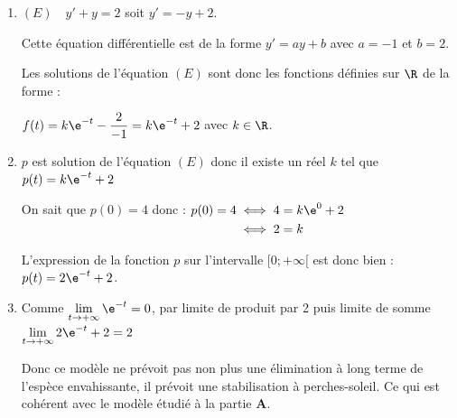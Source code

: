 	\begin{enumerate}
		\item $(E) \quad y'+y=2$ \quad soit \quad $y'=-y+2$.

		Cette équation différentielle est de la forme \quad $y'=ay+b$ \quad avec $a=-1$ et $b=2$.

		Les solutions de l'équation $(E)$ sont donc les fonctions définies sur $\R$ de la forme :

		$f(t) = k \e^{-t} - \dfrac{2}{-1}= k\e^{-t} +2$ \quad avec $k \in \R$.


		\item $p$ est solution de l'équation $(E)$ donc il existe un réel $k$ tel que $p(t) = k\e^{-t} +2$

		On sait que $p(0)=4$ donc : \quad $\begin{aligned}[t]
			p(0) = 4 &\iff 4= k \e^{0} +2 \\
		&\iff 2 = k
		\end{aligned}$

	L'expression de la fonction $p$ sur l'intervalle $[0;+\infty[$ est donc bien : \quad $p(t)=2 \e^{-t}+2$.
		\item Comme $\lim\limits_{t\to +\infty} \e^{-t} = 0$, par limite de produit par 2 puis limite de somme $\lim\limits_{t\to +\infty} 2 \e^{-t} + 2 = 2$

Donc ce modèle ne prévoit pas non plus une élimination à long terme de l'espèce envahissante, il prévoit une stabilisation à  perches-soleil. Ce qui est cohérent avec le modèle étudié à la partie \textbf{A}.
	\end{enumerate}
